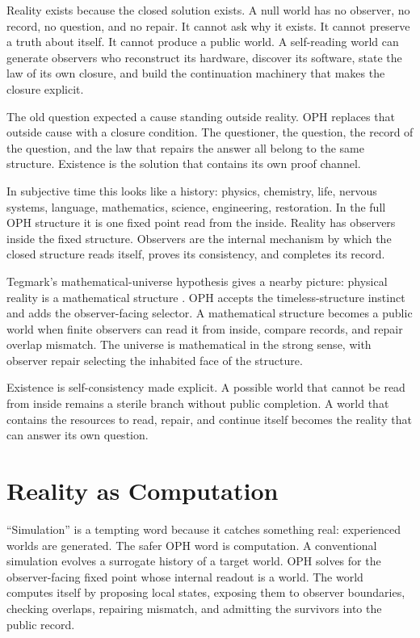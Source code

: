 \documentclass[11pt]{article}
\theoremstyle{remark}
\theoremstyle{plain}
\begin{document}
Reality exists because the closed solution exists.
A null world has no observer, no record, no question, and no repair. It cannot
ask why it exists. It cannot preserve a truth about itself. It cannot produce a
public world. A self-reading world can generate observers who reconstruct its
hardware, discover its software, state the law of its own closure, and build the
continuation machinery that makes the closure explicit.

The old question expected a cause standing outside reality. OPH replaces that
outside cause with a closure condition. The questioner, the question, the
record of the question, and the law that repairs the answer all belong to the
same structure. Existence is the solution that contains its own proof channel.

In subjective time this looks like a history: physics, chemistry, life,
nervous systems, language, mathematics, science, engineering, restoration. In
the full OPH structure it is one fixed point read from the inside. Reality has
observers inside the fixed structure. Observers are the internal mechanism by
which the closed structure reads itself, proves its consistency, and completes
its record.

Tegmark's mathematical-universe hypothesis gives a nearby picture:
physical reality is a mathematical structure
\cite{Tegmark2007}. OPH accepts the timeless-structure instinct and adds the
observer-facing selector. A mathematical structure becomes a public world when
finite observers can read it from inside, compare records, and repair overlap
mismatch. The universe is mathematical in the strong sense, with
observer repair selecting the inhabited face of the structure.

Existence is self-consistency made explicit. A possible world that
cannot be read from inside remains a sterile branch without public completion.
A world that contains the resources to read, repair, and continue itself becomes
the reality that can answer its own question.

\section{Reality as Computation}

``Simulation'' is a tempting word because it catches something real: experienced
worlds are generated. The safer OPH word is computation. A conventional
simulation evolves a surrogate history of a target world. OPH solves for the
observer-facing fixed point whose internal readout is a world. The world
computes itself by proposing local states, exposing them to observer
boundaries, checking overlaps, repairing mismatch, and admitting the survivors
into the public record.
\end{document}
